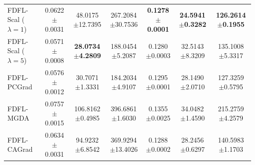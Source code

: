 \begin{table}[htbp]
\begin{tabular}{lccc|ccc}
FDFL-Scal ($\lambda=1$) & 0.0622 {\scriptsize$\pm$0.0031} & 48.0175 {\scriptsize$\pm$12.7395} & 267.2084 {\scriptsize$\pm$30.7536} & \textbf{0.1278 {\scriptsize$\pm$0.0001}} & \textbf{24.5941 {\scriptsize$\pm$0.3282}} & \textbf{126.2614 {\scriptsize$\pm$0.1955}} \\
FDFL-Scal ($\lambda=5$) & 0.0571 {\scriptsize$\pm$0.0008} & \textbf{28.0734 {\scriptsize$\pm$4.2809}} & 188.0454 {\scriptsize$\pm$5.2087} & 0.1280 {\scriptsize$\pm$0.0003} & 32.5143 {\scriptsize$\pm$8.3209} & 135.1008 {\scriptsize$\pm$5.3317} \\
\midrule
FDFL-PCGrad & 0.0576 {\scriptsize$\pm$0.0012} & 30.7071 {\scriptsize$\pm$1.3331} & 184.2034 {\scriptsize$\pm$4.9107} & 0.1295 {\scriptsize$\pm$0.0001} & 28.1490 {\scriptsize$\pm$2.0710} & 127.3259 {\scriptsize$\pm$0.5795} \\
FDFL-MGDA & 0.0757 {\scriptsize$\pm$0.0015} & 106.8162 {\scriptsize$\pm$0.4985} & 396.6861 {\scriptsize$\pm$1.6030} & 0.1355 {\scriptsize$\pm$0.0025} & 34.0482 {\scriptsize$\pm$1.4590} & 215.2759 {\scriptsize$\pm$4.2579} \\
FDFL-CAGrad & 0.0634 {\scriptsize$\pm$0.0031} & 94.9232 {\scriptsize$\pm$6.8542} & 369.9294 {\scriptsize$\pm$13.4026} & 0.1288 {\scriptsize$\pm$0.0002} & 28.2456 {\scriptsize$\pm$0.6297} & 140.5983 {\scriptsize$\pm$1.1703} \\
\bottomrule
\end{tabular}
\end{table}